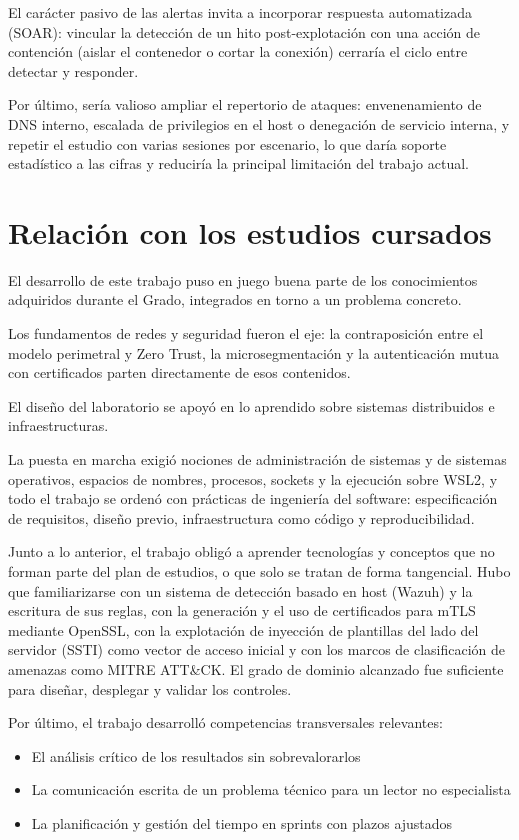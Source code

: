\documentclass[11pt,spanish,listoffigures,listoftables]{tfgetsinf}
\begin{document}
        El carácter pasivo de las alertas invita a incorporar respuesta automatizada (SOAR): vincular la detección de un hito post-explotación con una acción de contención (aislar el contenedor o cortar la conexión) cerraría el ciclo entre detectar y responder.
        
        Por último, sería valioso ampliar el repertorio de ataques: envenenamiento de DNS interno, escalada de privilegios en el host o denegación de servicio interna, y repetir el estudio con varias sesiones por escenario, lo que daría soporte estadístico a las cifras y reduciría la principal limitación del trabajo actual.

        \section{Relación con los estudios cursados}
        El desarrollo de este trabajo puso en juego buena parte de los conocimientos adquiridos durante el Grado, integrados en torno a un problema concreto. 

        Los fundamentos de redes y seguridad fueron el eje: la contraposición entre el modelo perimetral y Zero Trust, la microsegmentación y la autenticación mutua con certificados parten directamente de esos contenidos. 
        
        El diseño del laboratorio se apoyó en lo aprendido sobre sistemas distribuidos e infraestructuras.
        
        La puesta en marcha exigió nociones de administración de sistemas y de sistemas operativos, espacios de nombres, procesos, sockets y la ejecución sobre WSL2, y todo el trabajo se ordenó con prácticas de ingeniería del software: especificación de requisitos, diseño previo, infraestructura como código y reproducibilidad.
        
        Junto a lo anterior, el trabajo obligó a aprender tecnologías y conceptos que no forman parte del plan de estudios, o que solo se tratan de forma tangencial. Hubo que familiarizarse con un sistema de detección basado en host (Wazuh) y la escritura de sus reglas, con la generación y el uso de certificados para mTLS mediante OpenSSL, con la explotación de inyección de plantillas del lado del servidor (SSTI) como vector de acceso inicial y con los marcos de clasificación de amenazas como MITRE ATT\&CK. El grado de dominio alcanzado fue suficiente para diseñar, desplegar y validar los controles.
        
        Por último, el trabajo desarrolló competencias transversales relevantes: 
        \begin{itemize}
            \item El análisis crítico de los resultados sin sobrevalorarlos
            \item La comunicación escrita de un problema técnico para un lector no especialista
            \item La planificación y gestión del tiempo en sprints con plazos ajustados
        \end{itemize}
\end{document}
